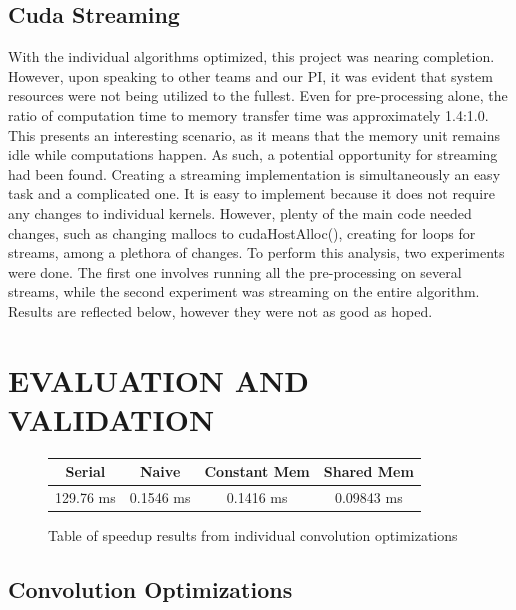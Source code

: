 \documentclass[12pt]{article}
\begin{document}
\subsection*{Cuda Streaming}
With the individual algorithms optimized, this project was nearing completion. However, upon speaking to other teams and our PI, it was evident that system resources were not being utilized to the fullest. Even for pre-processing alone, the ratio of computation time to memory transfer time was approximately 1.4:1.0. This presents an interesting scenario, as it means that the memory unit remains idle while computations happen. As such, a potential opportunity for streaming had been found.
Creating a streaming implementation is simultaneously an easy task and a complicated one. It is easy to implement because it does not require any changes to individual kernels. However, plenty of the main code needed changes, such as changing mallocs to cudaHostAlloc(), creating for loops for streams, among a plethora of changes.
To perform this analysis, two experiments were done. The first one involves running all the pre-processing on several streams, while the second experiment was streaming on the entire algorithm. Results are reflected below, however they were not as good as hoped.

\section{\MakeUppercase{Evaluation and Validation}}
\begin{figure}
\begin{center}
\begin{tabular}{ |c|c|c|c|} 
 \hline
 Serial & Naive & Constant Mem & Shared Mem \\ 
 \hline
 129.76 ms & 0.1546 ms & 0.1416 ms & 0.09843 ms\\
 \hline
\end{tabular}\caption{Table of speedup results from individual convolution optimizations}\label{table:convolutionTimes}
\end{center}
\end{figure}
\subsection{Convolution Optimizations}
\end{document}
